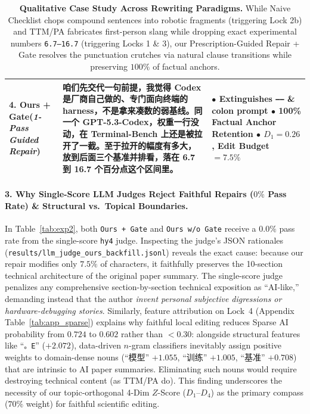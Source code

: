 \documentclass[11pt]{article}
\newcommand{\zh}[1]{#1}
\begin{document}
\begin{table}[t]
{\begin{tabular}{p{2.5cm}p{9.3cm}p{3.8cm}}
\midrule
\rowcolor{teal!8}
\textbf{4. Ours + Gate}\newline (\textit{1-Pass Guided Repair}) &
\textcolor{teal!70!black}{\textbf{咱们先交代一句前提，我觉得}} Codex \zh{是厂商自己做的、专门面向终端的} harness\zh{，不是拿来凑数的弱基线。同一个} \textbf{GPT-5.3-Codex}\zh{，权重一行没动，在} \textbf{Terminal-Bench} \zh{上还是被拉开了一截}\textcolor{teal!70!black}{\textbf{。至于拉开的幅度有多大}}\zh{，放到后面三个基准并排看，落在} \textbf{6.7} \zh{到} \textbf{16.7} \zh{个百分点这个区间里。} &
$\bullet$ \textbf{Extinguishes} \texttt{——} \& colon prompt\newline
$\bullet$ \textbf{100\% Factual Anchor Retention}\newline
$\bullet$ $D_1 = \mathbf{0.26}$, Edit Budget $= \mathbf{7.5\%}$ \\
\bottomrule
\end{tabular}%
}
\caption{\textbf{Qualitative Case Study Across Rewriting Paradigms.} While Naive Checklist chops compound sentences into robotic fragments (triggering Lock 2b) and TTM/PA fabricates first-person slang while dropping exact experimental numbers \texttt{6.7--16.7} (triggering Locks 1 \& 3), our Prescription-Guided Repair + Gate resolves the punctuation crutches via natural clause transitions while preserving $100\%$ of factual anchors.}
\label{tab:qualitative}
\end{table}

\paragraph{3. Why Single-Score LLM Judges Reject Faithful Repairs ($0\%$ Pass Rate) \& Structural vs.\ Topical Boundaries.}
In Table~\ref{tab:exp2}, both \texttt{Ours + Gate} and \texttt{Ours w/o Gate} receive a $0.0\%$ pass rate from the single-score \texttt{hy4} judge. Inspecting the judge's JSON rationales (\texttt{results/llm\_judge\_ours\_backfill.jsonl}) reveals the exact cause: because our repair modifies only $7.5\%$ of characters, it faithfully preserves the 10-section technical architecture of the original paper summary. The single-score judge penalizes any comprehensive section-by-section technical exposition as ``AI-like,'' demanding instead that the author \textit{invent personal subjective digressions or hardware-debugging stories}. Similarly, feature attribution on Lock~4 (Appendix Table~\ref{tab:app_sparse}) explains why faithful local editing reduces Sparse AI probability from $0.724$ to $0.602$ rather than $<0.30$: alongside structural features like ``\texttt{。E}'' ($+2.072$), data-driven $n$-gram classifiers inevitably assign positive weights to domain-dense nouns (``\zh{模型}'' $+1.055$, ``\zh{训练}'' $+1.005$, ``\zh{基准}'' $+0.708$) that are intrinsic to AI paper summaries. Eliminating such nouns would require destroying technical content (as TTM/PA do). This finding underscores the necessity of our topic-orthogonal 4-Dim $Z$-Score ($D_1$--$D_4$) as the primary compass ($70\%$ weight) for faithful scientific editing.
\end{document}
